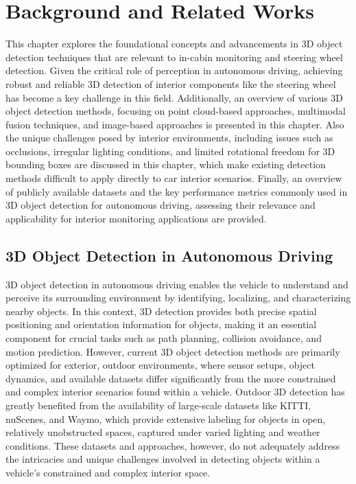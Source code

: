 \chapter{Background and Related Works}
This chapter explores the foundational concepts and advancements 
in 3D object detection techniques that are relevant to 
in-cabin monitoring and steering wheel detection. Given the critical 
role of perception in autonomous driving, achieving robust and reliable 
3D detection of interior components like the steering wheel has become a 
key challenge in this field. Additionally, an overview of 
various 3D object detection methods, focusing on point cloud-based 
approaches, multimodal fusion techniques, and image-based approaches is presented in this chapter. 
Also the unique challenges posed by interior environments, 
including issues such as occlusions, irregular lighting conditions, 
and limited rotational freedom for 3D bounding boxes are discussed in this chapter, which make existing detection methods difficult to apply directly to car interior scenarios. 
Finally, an overview of publicly available 
datasets and the key performance metrics commonly used in 3D object 
detection for autonomous driving, assessing their relevance and 
applicability for interior monitoring applications are provided.


\section{3D Object Detection in Autonomous Driving}
3D object detection in autonomous driving enables the vehicle to
understand and perceive its surrounding environment by identifying, 
localizing, and characterizing nearby objects. In this context, 
3D detection provides both precise spatial positioning and orientation 
information for objects, making it an essential component for crucial 
tasks such as path planning, collision avoidance, and motion prediction.
However, current 3D object detection methods are primarily optimized 
for exterior, outdoor environments, where sensor setups, object dynamics, 
and available datasets differ significantly from the more constrained and
complex interior scenarios found within a vehicle. Outdoor 3D detection
has greatly benefited from the availability of large-scale datasets like 
KITTI, nuScenes, and Waymo, which provide extensive labeling for objects 
in open, relatively unobstructed spaces, captured under varied lighting 
and weather conditions. These datasets and approaches, however, 
do not adequately address the intricacies and unique challenges 
involved in detecting objects within a vehicle's constrained and 
complex interior space.

